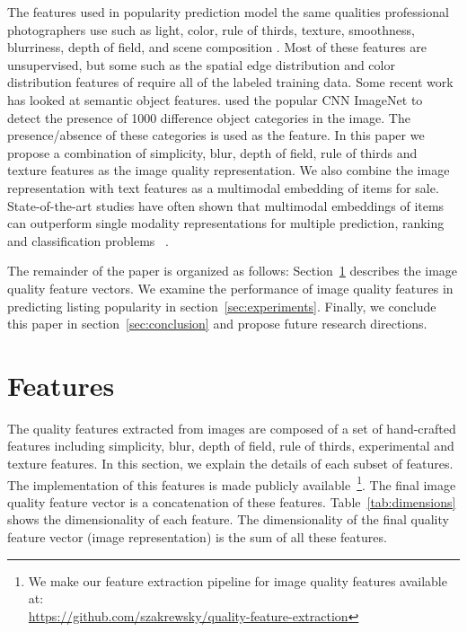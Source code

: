 \documentclass[conference,a4paper]{IEEEtran}
\begin{document}
The features used in popularity prediction model the same qualities professional photographers use such as light, color, rule of thirds, texture, smoothness, blurriness, depth of field, and scene composition \cite{ke2006design} \cite{datta2006studying} \cite{chen2014aesthetic} \cite{wang2015automatic}.  Most of these features are unsupervised, but some such as the spatial edge distribution and color distribution features of \cite{ke2006design} require all of the labeled training data.  Some recent work has looked at semantic object features.  \cite{khosla2014makes} used the popular CNN ImageNet to detect the presence of 1000 difference object categories in the image.  The presence/absence of these categories is used as the feature. In this paper we propose a combination of simplicity, blur, depth of field, rule of thirds and texture features as the image quality representation. We also combine the image representation with text features as a multimodal embedding of items for sale. State-of-the-art studies have often shown that multimodal embeddings of items can outperform single modality representations for multiple prediction, ranking and classification problems~\cite{lynch2015images} \cite{yu2014click} \cite{yu2015learning}.


The remainder of the paper is organized as follows:
Section~\ref{sec:features} describes the image quality feature vectors.  We examine the
performance of image quality features in predicting listing popularity in
section~\ref{sec:experiments}. Finally, we conclude this paper in
section~\ref{sec:conclusion} and propose future research directions.


\section{Features}
\label{sec:features}
The quality features extracted from images are composed of a set of hand-crafted features including simplicity, blur, depth of field, rule of thirds, experimental and texture features. In this section, we explain the details of each subset of features. The implementation of this features is made publicly available~\footnote{We make our feature extraction pipeline for image quality features available at:\\ \url{https://github.com/szakrewsky/quality-feature-extraction}}. The final image quality feature vector is a concatenation of these features. Table~\ref{tab:dimensions} shows the dimensionality of each feature. The dimensionality of the final quality feature vector (image representation) is the sum of all these features. 
\end{document}
